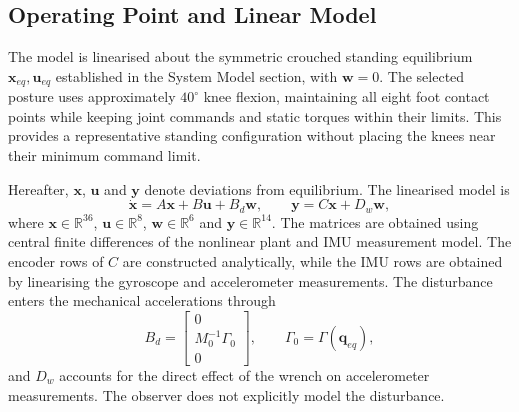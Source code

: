 \documentclass[conference,a4paper]{IEEEtran}
\begin{document}
\subsection{Operating Point and Linear Model}

The model is linearised about the symmetric crouched standing equilibrium $\mathbf{x}_{eq},\mathbf{u}_{eq}$ established in the System Model section, with $\mathbf{w}=0$. The selected posture uses approximately $40^\circ$ knee flexion, maintaining all eight foot contact points while keeping joint commands and static torques within their limits. This provides a representative standing configuration without placing the knees near their minimum command limit.

Hereafter, $\mathbf{x}$, $\mathbf{u}$ and $\mathbf{y}$ denote deviations from equilibrium. The linearised model is
\[
\dot{\mathbf{x}}=A\mathbf{x}+B\mathbf{u}+B_d\mathbf{w},
\qquad
\mathbf{y}=C\mathbf{x}+D_w\mathbf{w},
\]
where $\mathbf{x}\in\mathbb{R}^{36}$, $\mathbf{u}\in\mathbb{R}^{8}$, $\mathbf{w}\in\mathbb{R}^{6}$ and $\mathbf{y}\in\mathbb{R}^{14}$. The matrices are obtained using central finite differences of the nonlinear plant and IMU measurement model. The encoder rows of $C$ are constructed analytically, while the IMU rows are obtained by linearising the gyroscope and accelerometer measurements. The disturbance enters the mechanical accelerations through
\[
B_d=\begin{bmatrix}0\\M_0^{-1}\Gamma_0\\0\end{bmatrix},
\qquad \Gamma_0=\Gamma(\mathbf{q}_{eq}),
\]
and $D_w$ accounts for the direct effect of the wrench on accelerometer measurements. The observer does not explicitly model the disturbance.
\end{document}

